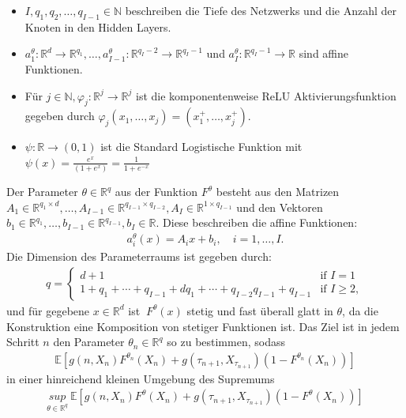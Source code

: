 \documentclass[12pt,titlepage,headsepline]{article}
\begin{document}
      \begin{itemize}
        \item $I,q_1,q_2,\ldots,q_{I-1} \in \mathbb{N}$ beschreiben die Tiefe des Netzwerks und die Anzahl der Knoten in den Hidden Layers.
        \item $a_1^{\theta}:\mathbb{R}^d \rightarrow \mathbb{R}^{q_1},\ldots,a_{I-1}^{\theta}:\mathbb{R}^{q_I-2} \rightarrow \mathbb{R}^{q_I-1}$ und $a_{I}^{\theta}:\mathbb{R}^{q_I-1} \rightarrow \mathbb{R}$ sind affine Funktionen.
        \item Für $j \in \mathbb{N}, \varphi_j:\mathbb{R}^j \rightarrow \mathbb{R}^j$ ist die komponentenweise ReLU Aktivierungsfunktion gegeben durch $\varphi_j(x_1,\ldots,x_j)=(x_1^+,\ldots,x_j^+)$.
        \item $\psi:\mathbb{R} \rightarrow (0,1)$ ist die Standard Logistische Funktion mit $\psi (x)=\frac{e^x}{(1+e^x)}=\frac{1}{1+e^{-x}}$
      \end{itemize}
      Der Parameter $\theta \in \mathbb{R}^q$ aus der Funktion $F^{\theta}$ besteht aus den Matrizen $A_1 \in \mathbb{R}^{q_1 \times d},\ldots,A_{I-1} \in \mathbb{R}^{q_{I-1} \times q_{I-2}},A_I \in \mathbb{R}^{1\times q_{I-1}}$ und den Vektoren $b_1 \in \mathbb{R}^{q_1},\ldots,b_{I-1}\in \mathbb{R}^{q_{I-1}},b_I \in \mathbb{R}$. Diese beschreiben die affine Funktionen:
      \begin{align*}
        a_i^{\theta}(x) = A_ix + b_i, \quad i=1,\ldots,I.
      \end{align*}
      Die Dimension des Parameterraums ist gegeben durch:
      \begin{align*}
        q = \begin{cases}
        d+1  &\text{if $I=1$}\\ 1+q_1+\cdots+q_{I-1}+dq_1+\cdots+q_{I-2}q_{I-1}+q_{I-1} &\text{if $I \geq 2$},
      \end{cases}
      \end{align*}
      und für gegebene $x \in \mathbb{R}^d$ ist $\ F^{\theta}(x)$ stetig und fast überall glatt in $\theta$, da die Konstruktion eine Komposition von stetiger Funktionen ist.
      \hfill\break
      Das Ziel ist in jedem Schritt $n$ den Parameter $\theta_n \in \mathbb{R}^q$ so zu bestimmen, sodass
      \begin{align*}
        \mathbb{E}[g(n,X_n)F^{\theta_n}(X_n)+g(\tau_{n+1},X_{\tau_{n+1}})(1-F^{\theta_n}(X_n))]
      \end{align*}
      in einer hinreichend kleinen Umgebung des Supremums
      \begin{align}\label{eqn: becker_functional}
        \underset{\theta \in \mathbb{R}^q}{sup} \ \mathbb{E}[g(n,X_n)F^{\theta}(X_n)+g(\tau_{n+1},X_{\tau_{n+1}})(1-F^{\theta}(X_n))]
      \end{align}
\end{document}
